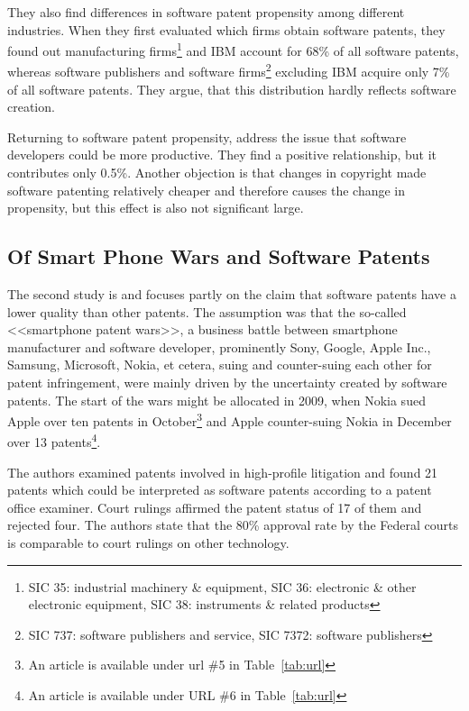 \documentclass[12pt, a4paper, abstract, parskip]{scrartcl}
\theoremstyle{definition}
\begin{document}
They also find differences in software patent propensity among different
industries. When they first evaluated which firms obtain software patents, they
found out manufacturing firms\footnote{SIC 35: industrial machinery \&
equipment, SIC 36: electronic \& other electronic equipment, SIC 38:
instruments \& related products} and IBM account for 68\% of all software
patents, whereas software publishers and software firms\footnote{SIC 737:
software publishers and service, SIC 7372: software publishers} excluding IBM
acquire only 7\% of all software patents. They argue, that this distribution
hardly reflects software creation.

Returning to software patent propensity, \citeauthor{bessen2007empirical}
address the issue that software developers could be more productive. They find
a positive relationship, but it contributes only 0.5\%. Another objection is
that changes in copyright made software patenting relatively cheaper and
therefore causes the change in propensity, but this effect is also not
significant large.



\subsection{Of Smart Phone Wars and Software Patents} %
\label{sub:of_smart_phone_wars_and_software_patents}

The second study is \citet{graham2013smart} and focuses partly on the claim
that software patents have a lower quality than other patents. The assumption
was that the so-called <<smartphone patent wars>>, a business battle between
smartphone manufacturer and software developer, prominently Sony, Google, Apple
Inc., Samsung, Microsoft, Nokia, et cetera, suing and counter-suing each other
for patent infringement, were mainly driven by the uncertainty created by
software patents. The start of the wars might be allocated in 2009, when Nokia
sued Apple over ten patents in October\footnote{An article is available under
url \#5 in Table~\ref{tab:url}} and Apple counter-suing Nokia in December over
13 patents\footnote{An article is available under URL \#6 in
Table~\ref{tab:url}}.

The authors examined patents involved in high-profile litigation and found 21
patents which could be interpreted as software patents according to a patent
office examiner. Court rulings affirmed the patent status of 17 of them and
rejected four. The authors state that the 80\% approval rate by the Federal
courts is comparable to court rulings on other technology.
\end{document}
